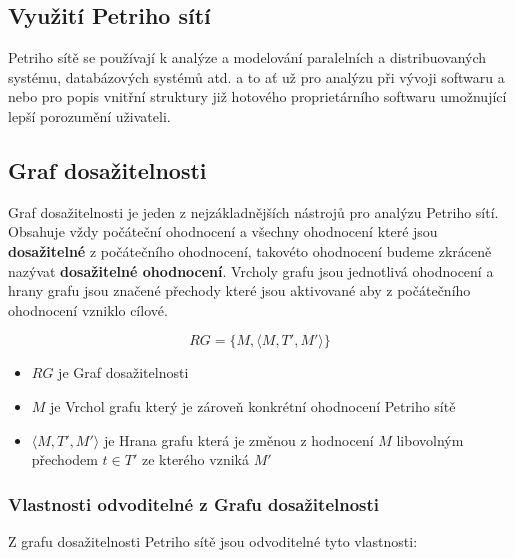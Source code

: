 \documentclass[
  biblatex,
  glossaries,
]{kidiplom}
\begin{document}
\subsection{Využití Petriho sítí}

Petriho sítě se používají k analýze a modelování paralelních
a distribuovaných systému, databázových systémů atd. a to ať už
pro analýzu při vývoji softwaru a nebo pro popis vnitřní struktury
již hotového proprietárního softwaru umožnující lepší porozumění uživateli.


\subsection{Graf dosažitelnosti}

Graf dosažitelnosti je jeden z nejzákladnějších nástrojů pro analýzu Petriho sítí.
Obsahuje vždy počáteční ohodnocení a všechny ohodnocení které jsou \textbf{dosažitelné} z počátečního ohodnocení, 
takovéto ohodnocení budeme zkráceně nazývat \textbf{dosažitelné ohodnocení}. 
Vrcholy grafu jsou jednotlivá ohodnocení
a hrany grafu jsou značené přechody které jsou aktivované aby z počátečního ohodnocení vzniklo cílové.

\begin{definition}
  $$RG = \{M, \langle M, T', M' \rangle\}$$
  \begin{itemize}
    \item $RG$ je Graf dosažitelnosti
    \item $M$ je Vrchol grafu který je zároveň konkrétní ohodnocení Petriho sítě
    \item $\langle M, T', M' \rangle$ je Hrana grafu která je změnou z hodnocení $M$ libovolným přechodem $t \in T'$ ze kterého vzniká $M'$
  \end{itemize}
\end{definition}

\subsubsection{Vlastnosti odvoditelné z Grafu dosažitelnosti}
Z grafu dosažitelnosti Petriho sítě jsou odvoditelné tyto vlastnosti:
\end{document}
